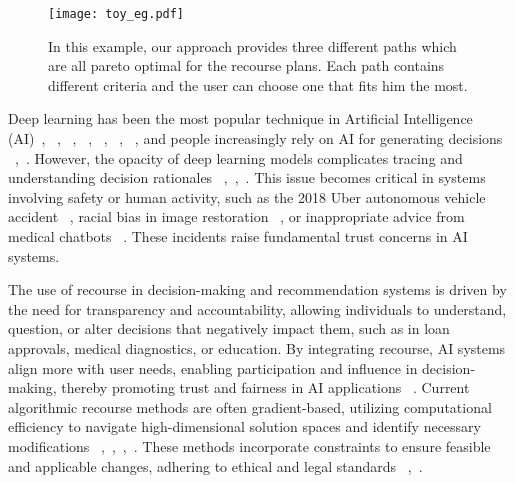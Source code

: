 \begin{figure}[ht]
\centering
\texttt{[image: toy\_eg.pdf]}
\caption{In this example, our approach provides three different paths which are all pareto optimal for the recourse plans. Each path contains different criteria and the user can choose one that fits him the most.}
\label{fig:toy eg}
\vspace{0.2cm}
\end{figure}




Deep learning has been the most popular technique in Artificial Intelligence (AI)~\cite{pouyanfar2018survey},
~\cite{zhao2019object}, 
~\cite{wang2021deep}, 
~\cite{otter2020survey}, 
~\cite{danilevsky2020survey}, 
~\cite{turay2022toward}, ~\cite{tang2022perception}, and people increasingly rely on AI for generating decisions ~\cite{zhang2021artificial},~\cite{peres2020industrial}. However, the opacity of deep learning models complicates tracing and understanding decision rationales ~\cite{daston2021objectivity},~\cite{balasubramaniam2022transparency},~\cite{srivastava2022xai}. This issue becomes critical in systems involving safety or human activity, such as the 2018 Uber autonomous vehicle accident ~\cite{lawless2022toward}, racial bias in image restoration ~\cite{reconstructpictureofBarackObama}, or inappropriate advice from medical chatbots ~\cite{chatbottoldafakepatienttokillthemselves}. These incidents raise fundamental trust concerns in AI systems.

The use of recourse in decision-making and recommendation systems is driven by the need for transparency and accountability, allowing individuals to understand, question, or alter decisions that negatively impact them, such as in loan approvals, medical diagnostics, or education. By integrating recourse, AI systems align more with user needs, enabling participation and influence in decision-making, thereby promoting trust and fairness in AI applications ~\cite{chen2020simple}. Current algorithmic recourse methods are often gradient-based, utilizing computational efficiency to navigate high-dimensional solution spaces and identify necessary modifications ~\cite{fokkema2023attribution},~\cite{karimi2021algorithmic},~\cite{NEURIPS2020_8ee7730e},~\cite{upadhyay2021towards}. These methods incorporate constraints to ensure feasible and applicable changes, adhering to ethical and legal standards ~\cite{gardner2022responsibility},~\cite{venkatasubramanian2020philosophical}.


